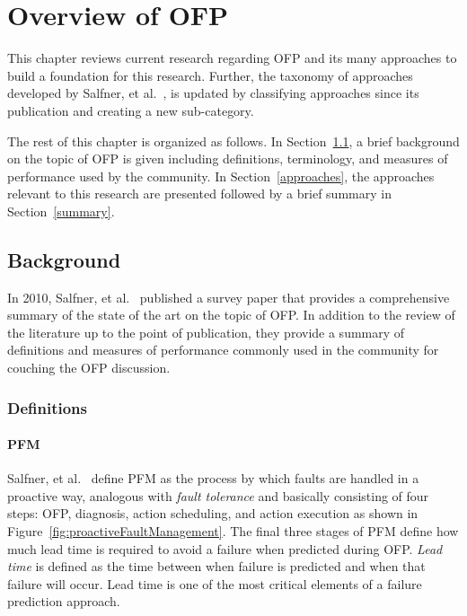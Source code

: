\chapter{Overview of \ac{OFP}} \label{chapter2}
This chapter reviews current research regarding \ac{OFP} and its many
approaches to build a foundation for this research.  Further, the taxonomy of
approaches developed by Salfner, et al.~\cite{salfnerSurvey}, is updated by
classifying approaches since its publication and creating a new sub-category.

The rest of this chapter is organized as follows.  In Section~\ref{background},
a brief background on the topic of \ac{OFP} is given including definitions,
terminology, and measures of performance used by the community.  In
Section~\ref{approaches}, the approaches relevant to this research are
presented followed by a brief summary in Section~\ref{summary}.

\section{Background} \label{background}
In 2010, Salfner, et al.~\cite{salfnerSurvey} published a survey paper that
provides a comprehensive summary of the state of the art on the topic of
\ac{OFP}.  In addition to the review of the literature up to the point of
publication, they provide a summary of definitions and measures of performance
commonly used in the community for couching the \ac{OFP} discussion.

\subsection{Definitions} \label{definitions}
\subsubsection{\ac{PFM}} \label{pfm}
Salfner, et al.~\cite{salfnerSurvey} define \ac{PFM} as the process by which
faults are handled in a proactive way, analogous with \emph{fault tolerance}
and basically consisting of four steps: \ac{OFP}, diagnosis, action scheduling,
and action execution as shown in Figure~\ref{fig:proactiveFaultManagement}.
The final three stages of \ac{PFM} define how much lead time is required to
avoid a failure when predicted during \ac{OFP}.  \emph{Lead time} is defined as
the time between when failure is predicted and when that failure will occur.
Lead time is one of the most critical elements of a failure prediction
approach.

